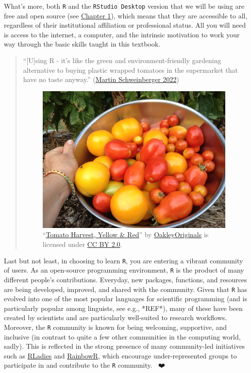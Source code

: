 \documentclass[
  letterpaper,
  DIV=11,
  numbers=noendperiod,
  oneside]{scrreprt}
\begin{document}
What's more, both \texttt{R} and the \texttt{RStudio\ Desktop} version
that we will be using are free and open source (see
\href{https://elenlefoll.github.io/RstatsTextbook/OpenScholarship.html}{Chapter
1}), which means that they are accessible to all, regardless of their
institutional affiliation or professional status. All you will need is
access to the internet, a computer, and the intrinsic motivation to work
your way through the basic skills taught in this textbook.

\begin{quote}
``{[}U{]}sing R - it's like the green and environment-friendly gardening
alternative to buying plastic wrapped tomatoes in the supermarket that
have no taste anyway.''
(\href{https://slcladal.github.io/whyr.html}{Martin Schweinberger 2022})

\begin{figure}

\includegraphics[width=3.91667in,height=\textheight]{images/TomatoHarvest.jpg}

\caption{\label{fig-tomatoes}``\href{https://www.flickr.com/photos/47264866@N00/9455141053}{Tomato
Harvest, Yellow \& Red}'' by
\href{https://www.flickr.com/photos/47264866@N00}{OakleyOriginals} is
licensed under
\href{https://creativecommons.org/licenses/by/2.0/?ref=openverse}{CC BY
2.0}.}

\end{figure}%
\end{quote}

Last but not least, in choosing to learn \texttt{R}, you are entering a
vibrant community of users. As an open-source programming environment,
\texttt{R} is the product of many different people's contributions.
Everyday, new packages, functions, and resources are being developed,
improved, and shared with the community. Given that \texttt{R} has
evolved into one of the most popular languages for scientific
programming (and is particularly popular among linguists, see e.g.,
*REF*), many of these have been created by scientists and are
particularly well-suited to research workflows. Moreover, the \texttt{R}
community is known for being welcoming, supportive, and inclusive (in
contrast to quite a few other communities in the computing world,
sadly). This is reflected in the strong presence of many community-led
initiatives such as \href{https://rladies.org/}{RLadies} and
\href{https://rainbowr.netlify.app/}{RainbowR}, which encourage
under-represented groups to participate in and contribute to the
\texttt{R} community. 💛🧡❤️💜💙💚
\end{document}
